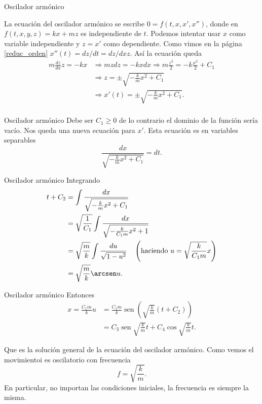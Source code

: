\documentclass[handout,hyperref={colorlinks=true}]{beamer}
\DeclareMathOperator{\sen}{sen}
\begin{document}
\begin{frame}{Oscilador armónico}

La ecuación del oscilador armónico se escribe $0=f(t,x,x',x'')$, donde en $f(t,x,y,z)=kx+mz$ es independiente de $t$. Podemos intentar usar $x$ como variable 
independiente y $z=x'$ como dependiente. Como vimos en la página \ref{reduc_orden} $x''(t)=dz/dt=dz/dx z$. Así la ecuación queda
\[\begin{split}
   m\frac{dz}{dx}z=-kx &\Longrightarrow mzdz=-kxdx\Longrightarrow m\frac{z^2}{2}=-k\frac{x^2}{2}+C_1\\
   &\Longrightarrow z=\pm\sqrt{-\frac{k}{m}x^2+C_1}\\
   &\Longrightarrow x'(t)=\pm\sqrt{-\frac{k}{m}x^2+C_1}.\\
  \end{split}
\]


\end{frame}


\begin{frame}{Oscilador armónico}
Debe ser $C_1\geq 0$ de lo contrario el dominio de la función sería vacío. Nos queda una nueva ecuación para $x'$.
Esta ecuación es en variables separables
\[ \frac{dx}{\sqrt{-\frac{k}{m}x^2+C_1}}=dt.   
\]

\end{frame}

\begin{frame}{Oscilador armónico}
 Integrando
\[\begin{split}
   t+C_2 
   &=\int \frac{dx}{\sqrt{-\frac{k}{m}x^2+C_1}}\\
   &= \sqrt{\frac{1}{C_1}} \int \frac{dx}{\sqrt{-\frac{k}{C_1m}x^2+1}} \\  
   &= \sqrt{\frac{m}{k}} \int \frac{du}{\sqrt{1-u^2}}\quad \left(\text{haciendo } u=\sqrt{\frac{k}{C_1m}}x\right)\\ 
   &=\sqrt{\frac{m}{k}}\arcsen u.
  \end{split}
\]
\end{frame}

\begin{frame}{Oscilador armónico}
Entonces
\[\begin{split}
    x=\frac{C_1m}{k}u &=\frac{C_1m}{k}\sen \left(\sqrt{\frac{k}{m}}(t+C_2)\right)\\
    &=\boxed{C_3\sen \sqrt{\frac{k}{m}}t+C_4\cos \sqrt{\frac{k}{m}}t}.
  \end{split}
 \]

Que es la solución general de la ecuación del oscilador armónico. Como vemos el movimientoi es oscilatorio con frecuencia
\[\boxed{f=\sqrt{\frac{k}{m}} }.\]
En particular, no importan las condiciones iniciales, la frecuencia es siempre la misma. 

 
 

\end{frame}
\end{document}

